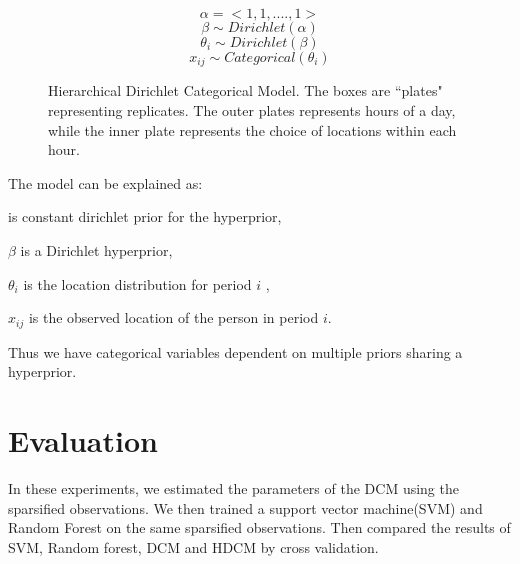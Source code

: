 \documentclass[11pt]{report}
\begin{document}
\noindent
\begin{figure}[htp]

\begin{minipage}{0.3\textwidth}
\centering


\end{minipage}%
\begin{minipage}{0.7\textwidth}

\begin{equation*}
	\alpha = <1, 1, .... , 1 > 
\end{equation*}
\begin{equation*}
	\beta \sim Dirichlet(\alpha)
\end{equation*}
\begin{equation*}
	\theta_i  \sim Dirichlet(\beta)
\end{equation*}
\begin{equation*}
	x_{ij} \sim Categorical(\theta_i)
\end{equation*}
\end{minipage}
\caption{Hierarchical Dirichlet Categorical Model. The boxes are ``plates" representing replicates. The outer plates represents hours of a day, while the inner plate represents the choice of locations within each hour.}
\label{hdcm}
\end{figure}

The model can be explained as:

	\boldmath{$\alpha$} is  constant dirichlet prior for the hyperprior, 
	
	$\beta$ is a Dirichlet hyperprior,
	
	$\theta_i$ is the location distribution for period $i$  ,
	
	$x_{ij}$ is the observed location of the person in period $i$.
	
Thus we have categorical variables dependent on multiple priors sharing a hyperprior.

\section{Evaluation}

In these experiments, we estimated the parameters of the DCM using the sparsified observations. We then trained a support vector machine(SVM) and Random Forest on the same sparsified observations. Then compared the results of SVM, Random forest, DCM and HDCM by cross validation.
\end{document}
